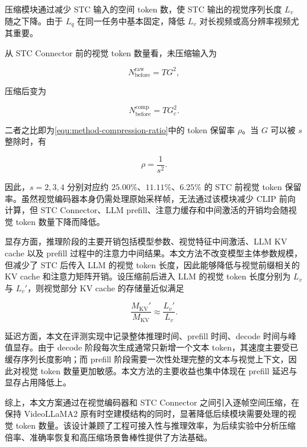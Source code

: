 \par 压缩模块通过减少 STC 输入的空间 token 数，使 STC 输出的视觉序列长度 $L_v$ 随之下降。由于 $L_q$ 在同一任务中基本固定，降低 $L_v$ 对长视频或高分辨率视频尤其重要。

\par 从 STC Connector 前的视觉 token 数量看，未压缩输入为

\begin{equation}
    \label{equ:method-token-before-stc-raw}
    N_{\mathrm{before}}^{\mathrm{raw}} = T G^2,
\end{equation}

\par 压缩后变为

\begin{equation}
    \label{equ:method-token-before-stc-compressed}
    N_{\mathrm{before}}^{\mathrm{comp}} = T G_c^2.
\end{equation}

\par 二者之比即为\autoref{equ:method-compression-ratio}中的 token 保留率 $\rho$。当 $G$ 可以被 $s$ 整除时，有

\begin{equation}
    \label{equ:method-complexity-scale}
    \rho = \frac{1}{s^2}.
\end{equation}

\par 因此，$s=2,3,4$ 分别对应约 $25.00\%$、$11.11\%$、$6.25\%$ 的 STC 前视觉 token 保留率。虽然视觉编码器本身仍需处理原始采样帧，无法通过该模块减少 CLIP 前向计算，但 STC Connector、LLM prefill、注意力缓存和中间激活的开销均会随视觉 token 数量下降而降低。

\par 显存方面，推理阶段的主要开销包括模型参数、视觉特征中间激活、LLM KV cache 以及 prefill 过程中的注意力中间结果。本文方法不改变模型主体参数规模，但减少了 STC 后传入 LLM 的视觉 token 长度，因此能够降低与视觉前缀相关的 KV cache 和注意力矩阵开销。设压缩前后进入 LLM 的视觉 token 长度分别为 $L_v$ 与 $L_v'$，则视觉部分 KV cache 的存储量近似满足

\begin{equation}
    \label{equ:method-kv-cache}
    \frac{M_{\mathrm{KV}}'}{M_{\mathrm{KV}}}
    \approx
    \frac{L_v'}{L_v}.
\end{equation}

\par 延迟方面，本文在评测实现中记录整体推理时间、prefill 时间、decode 时间与峰值显存。由于 decode 阶段每次生成通常只新增一个文本 token，其速度主要受已缓存序列长度影响；而 prefill 阶段需要一次性处理完整的文本与视觉上下文，因此对视觉 token 数量更加敏感。本文方法的主要收益也集中体现在 prefill 延迟与显存占用降低上。

\par 综上，本文方案通过在视觉编码器和 STC Connector 之间引入逐帧空间压缩，在保持 VideoLLaMA2 原有时空建模结构的同时，显著降低后续模块需要处理的视觉 token 数量。该设计兼顾了工程可接入性与推理效率，为后续实验中分析压缩倍率、准确率恢复和高压缩场景鲁棒性提供了方法基础。
